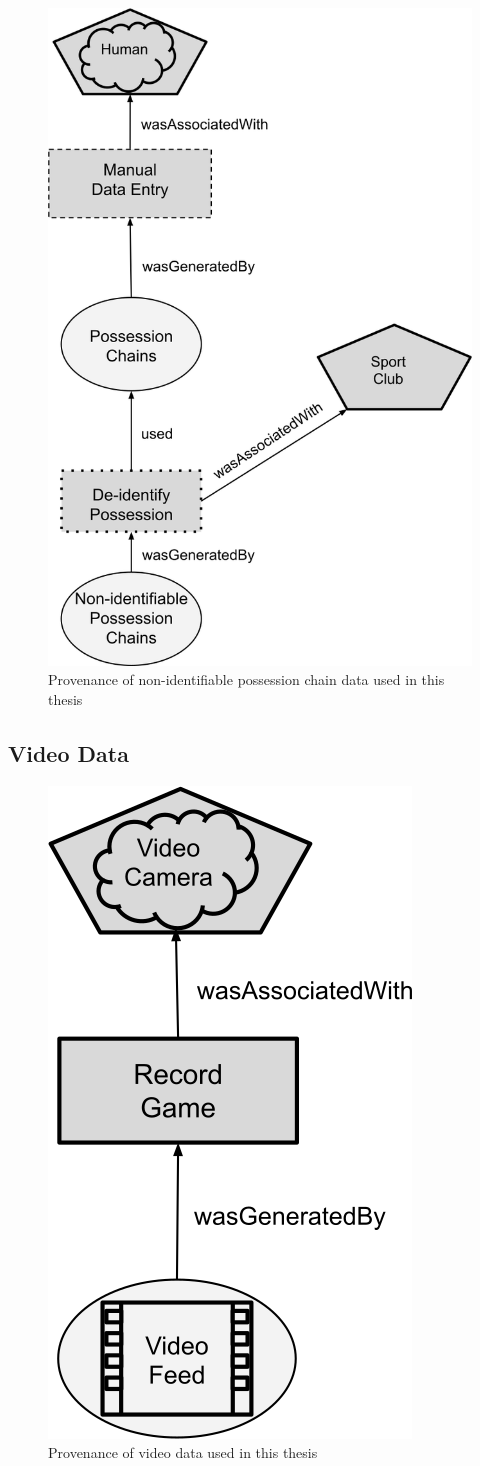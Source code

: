 \begin{figure}[hb]
\centering
\includegraphics[width=0.6\linewidth]{figs/prov/prov-1-b.png}
\caption{Provenance of non-identifiable possession chain data used in this thesis \notationdetails{}
\label{fig:prov1b}}
\end{figure}

\subsection{Video Data}

\begin{figure}[H]
\centering
\includegraphics[width=0.3\linewidth]{figs/prov/prov-1-a.png}
\caption{Provenance of video data used in this thesis \notationdetails{}
\label{fig:prov1a}}
\end{figure}

